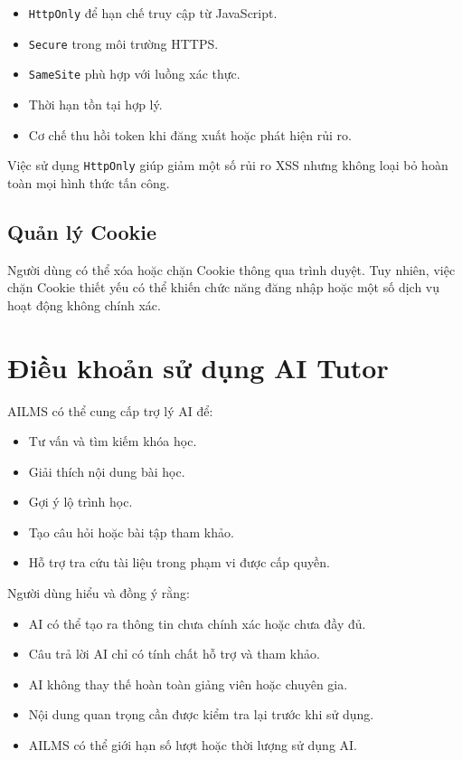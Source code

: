 \documentclass[12pt,a4paper]{article}
\begin{document}
\begin{itemize}
    \item \texttt{HttpOnly} để hạn chế truy cập từ JavaScript.
    \item \texttt{Secure} trong môi trường HTTPS.
    \item \texttt{SameSite} phù hợp với luồng xác thực.
    \item Thời hạn tồn tại hợp lý.
    \item Cơ chế thu hồi token khi đăng xuất hoặc phát hiện rủi ro.
\end{itemize}

Việc sử dụng \texttt{HttpOnly} giúp giảm một số rủi ro XSS
nhưng không loại bỏ hoàn toàn mọi hình thức tấn công.

\subsection{Quản lý Cookie}

Người dùng có thể xóa hoặc chặn Cookie thông qua trình duyệt.
Tuy nhiên, việc chặn Cookie thiết yếu có thể khiến chức năng đăng nhập
hoặc một số dịch vụ hoạt động không chính xác.

\section{Điều khoản sử dụng AI Tutor}

AILMS có thể cung cấp trợ lý AI để:

\begin{itemize}
    \item Tư vấn và tìm kiếm khóa học.
    \item Giải thích nội dung bài học.
    \item Gợi ý lộ trình học.
    \item Tạo câu hỏi hoặc bài tập tham khảo.
    \item Hỗ trợ tra cứu tài liệu trong phạm vi được cấp quyền.
\end{itemize}

Người dùng hiểu và đồng ý rằng:

\begin{itemize}
    \item AI có thể tạo ra thông tin chưa chính xác hoặc chưa đầy đủ.
    \item Câu trả lời AI chỉ có tính chất hỗ trợ và tham khảo.
    \item AI không thay thế hoàn toàn giảng viên hoặc chuyên gia.
    \item Nội dung quan trọng cần được kiểm tra lại trước khi sử dụng.
    \item AILMS có thể giới hạn số lượt hoặc thời lượng sử dụng AI.
\end{itemize}
\end{document}
